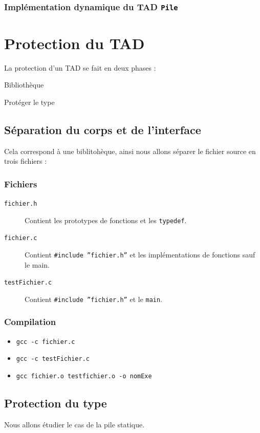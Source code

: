 \subsubsection{Implémentation dynamique du TAD \texttt{Pile}}


\section{Protection du TAD}
La protection d'un TAD se fait en deux phases : 
\begin{description}
	\item[séparer corps - interface] Bibliothèque 
	\item Protéger le type
\end{description}
\subsection{Séparation du corps et de l'interface}
	Cela correspond à une biblitohèque, ainsi nous allons séparer le fichier source en trois fichiers : 
	\subsubsection{Fichiers}
	\begin{description}
		\item[\texttt{fichier.h}] Contient les prototypes de fonctions et les \texttt{typedef}.
		\item[\texttt{fichier.c}] Contient \texttt{\#include ''fichier.h''} et les implémentations de fonctions sauf le main.
		\item[\texttt{testFichier.c}] Contient \texttt{\#include ''fichier.h''} et le \texttt{main}.
	\end{description}
	\subsubsection{Compilation}	
	\begin{itemize}
		\item \texttt{gcc -c fichier.c}
		\item \texttt{gcc -c testFichier.c}
		\item \texttt{gcc fichier.o testfichier.o -o nomExe}
	\end{itemize}
	\subsection{Protection du type}
	Nous allons étudier le cas de la pile statique.

